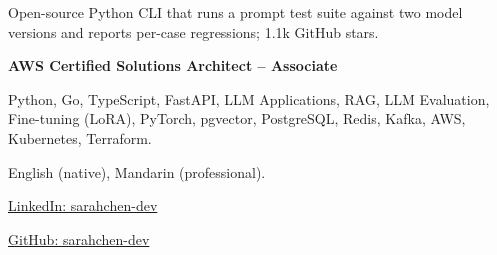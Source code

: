 \begin{resumecolumns}
\begin{highlights}
  \item Open-source Python CLI that runs a prompt test suite against two model
    versions and reports per-case regressions; 1.1k GitHub stars.
\end{highlights}

\textbf{AWS Certified Solutions Architect -- Associate}

%
%

\resumesidebar


Python, Go, TypeScript, FastAPI, LLM Applications, RAG, LLM Evaluation, Fine-tuning (LoRA), PyTorch, pgvector, PostgreSQL, Redis, Kafka, AWS, Kubernetes, Terraform.

English (native), Mandarin (professional).

\href{https://example.com/linkedin}{LinkedIn: sarahchen-dev}\par
\href{https://example.com/github}{GitHub: sarahchen-dev}
\end{resumecolumns}

